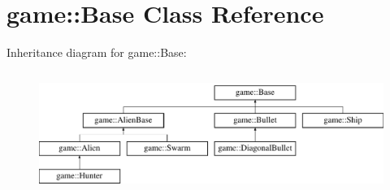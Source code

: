 \hypertarget{classgame_1_1Base}{}\section{game\+:\+:Base Class Reference}
\label{classgame_1_1Base}
Inheritance diagram for game\+:\+:Base\+:\begin{figure}[H]
\begin{center}
\leavevmode
\includegraphics[height=4.000000cm]{classgame_1_1Base}
\end{center}
\end{figure}
